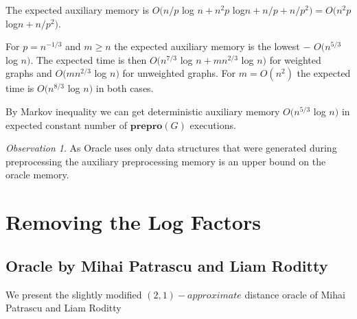\documentclass[shortabstract, lic, english]{iithesis}
\theoremstyle{definition} \newtheorem{definition}{Definition}[chapter]
\theoremstyle{remark} \newtheorem{remark}[definition]{Observation}
\theoremstyle{plain} \newtheorem{theorem}[definition]{Theorem}
\theoremstyle{plain} \newtheorem{lemma}[definition]{Lemma}
\theoremstyle{plain} \newtheorem{conjecture}[definition]{Conjecture}
\DeclarePairedDelimiter{\ceil}{\lceil}{\rceil}
\begin{document}
The expected auxiliary memory is $O(n/p $ log $ n + n^2p$ log$ n + n/p + n/p^2) = O(n^2p$ log$ n + n/p^2)$.

For $p = n^{-1/3}$ and $m \geq n$ the expected auxiliary memory is the lowest $-$ $O(n^{5/3} $ log $ n)$.
The expected time is then $O(n^{7/3} $ log $ n + mn^{2/3}$ log $ n)$ for weighted graphs and
$O(mn^{2/3}$ log $ n)$ for unweighted graphs. For $m = O(n^2)$ the expected time is $O(n^{8/3} $ log $n)$ in both cases.

By Markov inequality we can get deterministic auxiliary memory $O(n^{5/3} $ log $ n)$ in expected constant number of $\mathbf{prepro}(G)$ executions.

\begin{remark}
As Oracle uses only data structures that were generated during preprocessing the auxiliary preprocessing memory is an upper bound on the oracle memory.
\end{remark}






\chapter{Removing the Log Factors} \label{21TheoreticalComparison}

\section{Oracle by Mihai Patrascu and Liam Roditty} \label{21OraclePatRod}

We present the slightly modified $(2,1)-approximate$ distance oracle of Mihai Patrascu and Liam Roditty \cite{21OracleLessMemory}

\noindent{}
\end{document}
